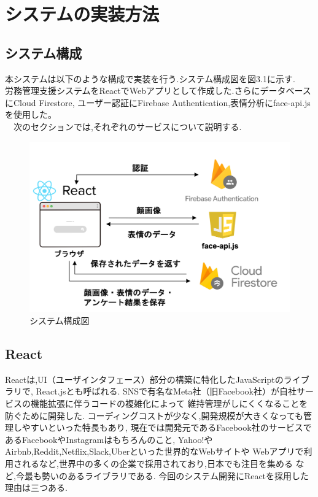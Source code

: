 \chapter{システムの実装方法}
\label{chp:reference}

\section{システム構成}
\label{sec:reference_ftnote}
本システムは以下のような構成で実装を行う.システム構成図を図3.1に示す.\\
労務管理支援システムをReactでWebアプリとして作成した.さらにデータベースにCloud Firestore,
ユーザー認証にFirebase Authentication,表情分析にface-api.jsを使用した。\\
　次のセクションでは,それぞれのサービスについて説明する.

\begin{figure}[!h]
	\begin{center}
			\includegraphics[scale=1.2, clip]{./img/compose.png}
			\caption{システム構成図}
			\label{fig:図の名前}
	\end{center}
\end{figure}


\section{React}
\label{sec:reference_quote}
Reactは,UI（ユーザインタフェース）部分の構築に特化したJavaScriptのライブラリで,
React.jsとも呼ばれる.
SNSで有名なMeta社（旧Facebook社）が自社サービスの機能拡張に伴うコードの複雑化によって
維持管理がしにくくなることを防ぐために開発した.
コーディングコストが少なく,開発規模が大きくなっても管理しやすいといった特長もあり,
現在では開発元であるFacebook社のサービスであるFacebookやInstagramはもちろんのこと,
Yahoo!やAirbnb,Reddit,Netflix,Slack,Uberといった世界的なWebサイトや
Webアプリで利用されるなど,世界中の多くの企業で採用されており,日本でも注目を集める
など,今最も勢いのあるライブラリである.
今回のシステム開発にReactを採用した理由は三つある.

